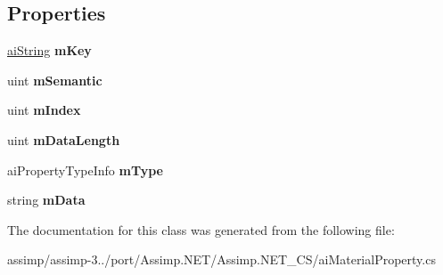 \subsection*{Properties}
\begin{DoxyCompactItemize}
\item 
\hypertarget{classai_material_property_a12f97a270e52346e88b6729271447c00}{\hyperlink{structai_string}{ai\+String} {\bfseries m\+Key}}\label{classai_material_property_a12f97a270e52346e88b6729271447c00}

\item 
\hypertarget{classai_material_property_a48d1ee1c0e32dadbc48d6ea3f1c3572b}{uint {\bfseries m\+Semantic}}\label{classai_material_property_a48d1ee1c0e32dadbc48d6ea3f1c3572b}

\item 
\hypertarget{classai_material_property_a332867bd7ed2c2698a50305495e0fe67}{uint {\bfseries m\+Index}}\label{classai_material_property_a332867bd7ed2c2698a50305495e0fe67}

\item 
\hypertarget{classai_material_property_a65b72b8667edbe15beadf829fc9259fa}{uint {\bfseries m\+Data\+Length}}\label{classai_material_property_a65b72b8667edbe15beadf829fc9259fa}

\item 
\hypertarget{classai_material_property_a5d161bef8c790142e2325fb8debe7860}{ai\+Property\+Type\+Info {\bfseries m\+Type}}\label{classai_material_property_a5d161bef8c790142e2325fb8debe7860}

\item 
\hypertarget{classai_material_property_a9fe45a691a8df169d69b369d748ef5ac}{string {\bfseries m\+Data}}\label{classai_material_property_a9fe45a691a8df169d69b369d748ef5ac}

\end{DoxyCompactItemize}


The documentation for this class was generated from the following file\+:\begin{DoxyCompactItemize}
\item 
assimp/assimp-\/3../port/\+Assimp.\+N\+E\+T/\+Assimp.\+N\+E\+T\+\_\+\+C\+S/ai\+Material\+Property.\+cs\end{DoxyCompactItemize}
